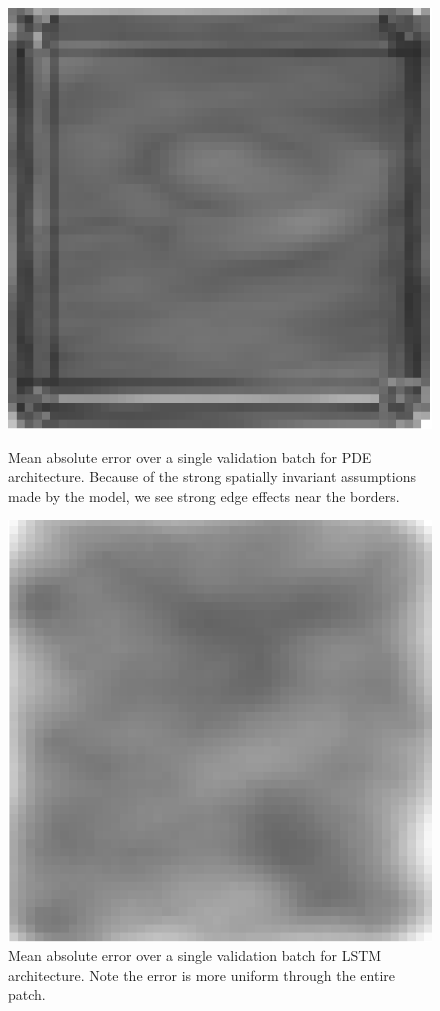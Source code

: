 \documentclass[12pt]{article}
\theoremstyle{plain}
\theoremstyle{remark}
\theoremstyle{definition}
\begin{document}
    \begin{figure}
        \begin{minipage}[t]{0.45\linewidth}
            \centering
            \includegraphics[width=0.7\linewidth]{pde_prediction}
            \caption{Mean absolute error over a single validation batch for PDE architecture. Because of the strong spatially invariant assumptions made by the model, we see strong edge effects near the borders. }
            \label{fig:pdeprediction}
        \end{minipage}
        \begin{minipage}[t]{0.1\linewidth}
            \centering
            \hspace{1\linewidth}
        \end{minipage}
        \begin{minipage}[t]{0.45\linewidth}
            \centering
            \includegraphics[width=0.7\linewidth]{lstm_prediction}
            \caption{Mean absolute error over a single validation batch for LSTM architecture. Note the error is more uniform through the entire patch. }
            \label{fig:lstmprediction}
        \end{minipage}
    \end{figure}
\end{document}
